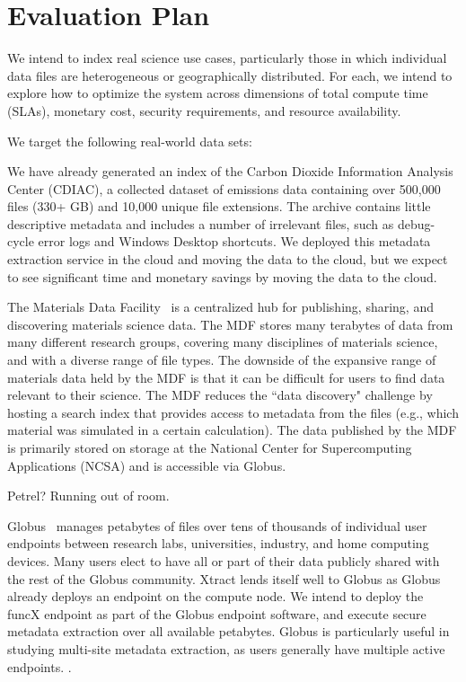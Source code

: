 \documentclass[sigconf]{acmart}
\newcommand{\tyler}[1]{}
\newcommand{\kyle}[1]{}
\newcommand{\tyler}[1]{{\textcolor{cyan}{ tyler: #1 }}}
\newcommand{\kyle}[1]{{\textcolor{purple}{ Kyle: #1 }}}
\begin{document}
\section{Evaluation Plan}
\label{sec:eval}

We intend to index real science use cases, particularly those in which individual data files are heterogeneous 
or geographically distributed. For each, we intend to explore how to optimize the system across dimensions of 
total compute time (SLAs), monetary cost, security requirements, and resource availability.

We target the following real-world data sets: 

We have already generated an index of the Carbon Dioxide Information Analysis Center (CDIAC), a collected dataset of 
emissions data containing over 500,000 files (330+ GB) and 10,000 unique file extensions. The archive contains little 
descriptive metadata and includes a number of irrelevant files, such as debug-cycle error logs and Windows Desktop 
shortcuts.  We deployed this metadata extraction service in the cloud and moving the data to the cloud, but we expect 
to see significant time and monetary savings by moving the data to the cloud.  

The Materials Data Facility~\cite{blaiszik2016materials, blaiszik2019mdf}
is a centralized hub for publishing, sharing, and discovering materials science data. 
The MDF stores many terabytes of data from many different research groups, covering many disciplines of 
materials science, and with a diverse range of file types.
The downside of the expansive range of materials data held by the MDF 
is that it can be difficult for users to find data relevant to their science.
The MDF reduces the ``data discovery" challenge by hosting a search index that provides access to metadata from the 
files (e.g., which material was simulated in a certain calculation).
The data published by the MDF is primarily stored on storage at the National Center for Supercomputing Applications
(NCSA) and is accessible via Globus.  

Petrel? Running out of room. 

Globus~\cite{ananthakrishnan2018globus} manages petabytes of files over tens of thousands of individual user endpoints between research labs, 
universities, industry, and home computing devices. Many \tyler{???} users elect to have all or part of their data publicly 
shared with the rest of the Globus community. \kyle{private sharing could also be indexed} Xtract lends itself well to Globus as Globus already deploys an 
endpoint on the compute node.  We intend to deploy the funcX endpoint as part of the Globus endpoint software, and 
execute secure metadata extraction over all available petabytes. Globus is particularly useful in studying multi-site 
metadata extraction, as users generally have multiple active endpoints. \tyler{more detail}. 
\end{document}
